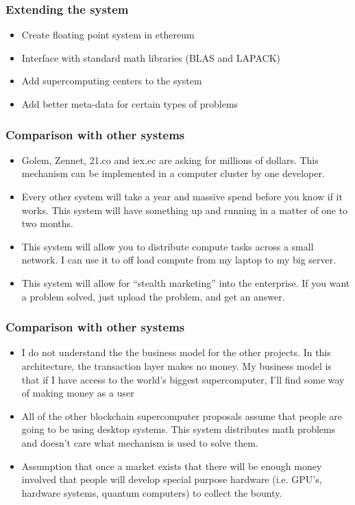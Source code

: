 \documentclass{beamer}
\begin{document}
\begin{frame}
  \frametitle{Extending the system}
  \begin{itemize}
  \item Create floating point system in ethereum
  \item Interface with standard math libraries (BLAS and LAPACK)
  \item Add supercomputing centers to the system
  \item Add better meta-data for certain types of problems
  \end{itemize}
\end{frame}
\begin{frame}
  \frametitle{Comparison with other systems}
  \begin{itemize}
    \item Golem, Zennet, 21.co and iex.ec are asking for millions of
      dollars.  This mechanism can be implemented in a computer
      cluster by one developer.
    \item Every other system will take a year and massive spend before
      you know if it works.  This system will have something up and
      running in a matter of one to two months.
    \item This system will allow you to distribute compute tasks
      across a small network. I can use it to off load compute from my
      laptop to my big server.
    \item This system will allow for ``stealth marketing'' into the
      enterprise.  If you want a problem solved, just upload the
      problem, and get an answer.
  \end{itemize}
\end{frame}
\begin{frame}
    \frametitle{Comparison with other systems}
    \begin{itemize}
    \item I do not understand the the business model for the other
      projects.  In this architecture, the transaction layer makes no
      money.  My business model is that if I have access to the
      world's biggest supercomputer, I'll find some way of making
      money as a user
    \item All of the other blockchain supercomputer proposals assume
      that people are going to be using desktop systems.  This system
      distributes math problems and doesn't care what mechanism is
      used to solve them.
    \item Assumption that once a market exists that there will be
      enough money involved that people will develop special purpose
      hardware (i.e. GPU's, hardware systems, quantum computers) to
      collect the bounty.  
    \end{itemize}
\end{frame}
\end{document}
